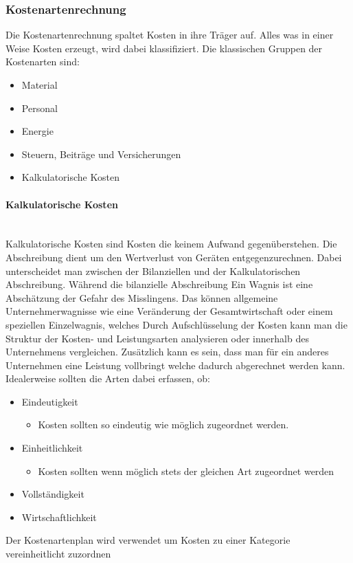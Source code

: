 \documentclass{article}
\newcommand{\paragraphlb}[1]{\paragraph{#1}\mbox{}\\}
\begin{document}
	\subsubsection{Kostenartenrechnung}
	Die Kostenartenrechnung spaltet Kosten in ihre Träger auf. Alles was in einer Weise Kosten erzeugt, wird dabei klassifiziert. Die klassischen Gruppen der Kostenarten sind:
	\begin{itemize}
		\item{Material}
		\item{Personal}
		\item{Energie}
		\item{Steuern, Beiträge und Versicherungen}
		\item{Kalkulatorische Kosten}
	\end{itemize}
	\paragraphlb{Kalkulatorische Kosten}
	Kalkulatorische Kosten sind Kosten die keinem Aufwand gegenüberstehen.
	Die Abschreibung dient um den Wertverlust von Geräten entgegenzurechnen. Dabei unterscheidet man zwischen der Bilanziellen und der Kalkulatorischen Abschreibung. Während die bilanzielle Abschreibung
	Ein Wagnis ist eine Abschätzung der Gefahr des Misslingens. Das können allgemeine Unternehmerwagnisse wie eine Veränderung der Gesamtwirtschaft oder einem speziellen Einzelwagnis, welches
	Durch Aufschlüsselung der Kosten kann man die Struktur der Kosten- und Leistungsarten analysieren oder innerhalb des Unternehmens vergleichen. Zusätzlich kann es sein, dass man für ein anderes Unternehmen eine Leistung vollbringt welche dadurch abgerechnet werden kann. Idealerweise sollten die Arten dabei erfassen, ob:
	\begin{itemize}
		\item{Eindeutigkeit}
		\begin{itemize}
			\item{Kosten sollten so eindeutig wie möglich zugeordnet werden.}
		\end{itemize}
		\item{Einheitlichkeit}
		\begin{itemize}
			\item{Kosten sollten wenn möglich stets der gleichen Art zugeordnet werden}
		\end{itemize}
		\item{Vollständigkeit}
		\item{Wirtschaftlichkeit}
	\end{itemize}
	Der Kostenartenplan wird verwendet um Kosten zu einer Kategorie vereinheitlicht zuzordnen
\end{document}
